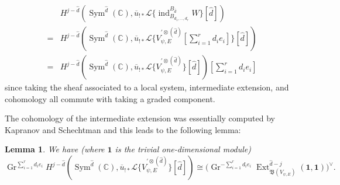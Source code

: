 \documentclass[11pt,letterpaper]{article}
\newtheorem{lemma}[theorem]{Lemma}
\theoremstyle{definition}
\theoremstyle{remark}
\numberwithin{equation}{section}
\theoremstyle{dotless}
\newcommand{\Gr}{\operatorname{Gr}}
\newcommand{\hchi}{\psi} %
\begin{document}
\begin{equation}\label{top-to-KS} \begin{aligned} 
& H^{j-\hat{d}}  ( \operatorname{Sym}^{\hat{d} } (\mathbb C),  \overline{u}_{!*} \mathcal L\{\operatorname{ind}_{B_{d_1,\dots,d_r}}^{B_{\hat{d}}} W\} [\hat{d}]) \\
= & H^{j-\hat{d}}  ( \operatorname{Sym}^{\hat{d} } (\mathbb C),  \overline{u}_{!*} \mathcal L\{ V^{ '\otimes (\hat{d})}_{\hchi ,E}[\sum_{i=1}^r d_i e_i]  \} [\hat{d}] )\\
 = & H^{j-\hat{d}}  ( \operatorname{Sym}^{\hat{d} } (\mathbb C),  \overline{u}_{!*} \mathcal L\{ V^{ '\otimes (\hat{d})}_{\hchi ,E} \} [\hat{d}]) [\sum_{i=1}^r d_i e_i] \end{aligned}\end{equation} since taking the sheaf associated to a local system, intermediate extension, and cohomology all commute with taking a graded component.

The cohomology of the intermediate extension was essentially computed by Kapranov and Schechtman and this leads to the following lemma:

\begin{lemma}\label{ks-to-nichols} We have (where $\mathbf 1$ is the trivial one-dimensional module) \[  \Gr^{ \sum_{i=1}^r d_i e_i}  H^{j-\hat{d}}  ( \operatorname{Sym}^{\hat{d} } (\mathbb C),  \overline{u}_{!*} \mathcal L\{ V^{ '\otimes (\hat{d})}_{\hchi ,E} \} [\hat{d}]) 
\cong  \Biggl(  \Gr^{ -\sum_{i=1}^r d_i e_i}  \operatorname{Ext}^{\hat{d}-j } _{ \mathfrak B( V_{\hchi,E} )} (\mathbf 1, \mathbf 1)  \Biggr)^\vee. \]\end{lemma}
\end{document}
